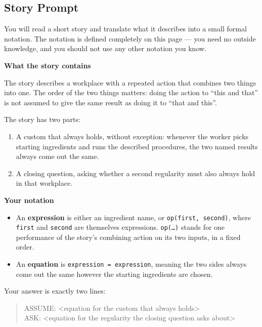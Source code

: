 \documentclass{article}
\begin{document}
\subsection{Story Prompt}
\begin{promptbox}
\footnotesize
\raggedright

You will read a short story and translate what it describes into a small
formal notation. The notation is defined completely on this page --- you need
no outside knowledge, and you should not use any other notation you know.

\vspace{0.6em}
\noindent\textbf{What the story contains}

The story describes a workplace with a repeated action that combines two
things into one. The order of the two things matters: doing the action to
``this and that'' is not assumed to give the same result as doing it to
``that and this''.

The story has two parts:
\begin{enumerate}
  \item A custom that always holds, without exception: whenever the worker
    picks starting ingredients and runs the described procedures, the two
    named results always come out the same.
  \item A closing question, asking whether a second regularity must also
    always hold in that workplace.
\end{enumerate}

\vspace{0.4em}
\noindent\textbf{Your notation}
\begin{itemize}
  \item An \textbf{expression} is either an ingredient name, or
    \texttt{op(first, second)}, where \texttt{first} and \texttt{second} are
    themselves expressions. \texttt{op(\ldots)} stands for one performance of
    the story's combining action on its two inputs, in a fixed order.
  \item An \textbf{equation} is \texttt{expression = expression}, meaning the
    two sides always come out the same however the starting ingredients are
    chosen.
\end{itemize}

Your answer is exactly two lines:
\begin{quote}\ttfamily
ASSUME: <equation for the custom that always holds>\\
ASK: <equation for the regularity the closing question asks about>
\end{quote}


\end{promptbox}
\end{document}
